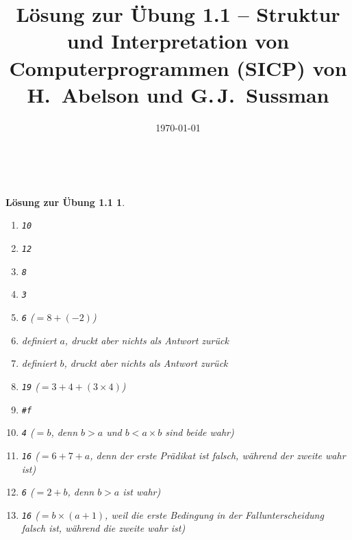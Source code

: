 \documentclass[a4paper,11pt,reqno]{amsart}
\theoremstyle{uremark}
\newtheorem*{loes}{L\"osung zur \"Ubung 1.1}
\begin{document}
\title[]{L\"osung zur \"Ubung 1.1 -- Struktur und Interpretation von
Computerprogrammen (SICP) von H.~Abelson und G.\,J.~Sussman}
\author{\href{https://github.com/pzuehlke}{}}
\date{\today}
\maketitle
\

\begin{loes}\ 
\begin{enumerate}[label=\small$\bullet$]
    \item \texttt{10}
    \item \texttt{12}
    \item \texttt{8}
    \item \texttt{3}
    \item \texttt{6} ($ = 8  + (-2)$)
    \item definiert $ a $, druckt aber nichts als Antwort zur\"uck
    \item definiert $ b $, druckt aber nichts als Antwort zur\"uck
    \item \texttt{19} ($ = 3 + 4 + (3 \times 4) $) 
    \item \texttt{\#f}
    \item \texttt{4} ($ = b $, denn $ b > a $ und $ b < a \times b $ sind beide
            wahr)
    \item \texttt{16} ($ = 6 + 7 + a $, denn der erste Pr\"adikat ist
        falsch, w\"ahrend der zweite wahr ist)
    \item \texttt{6} ($ = 2 + b $, denn $ b > a $ ist wahr)
    \item \texttt{16} ($ = b \times (a + 1) $, weil die erste Bedingung in der
        Fallunterscheidung \ttt{cond} falsch ist, w\"ahrend die zweite wahr ist)
\end{enumerate}
\end{loes}
\end{document}
